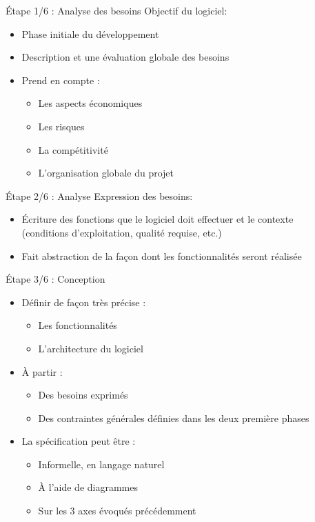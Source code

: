 \documentclass[14pt]{beamer}
\begin{document}
\begin{framentitle}{Étape 1/6 : Analyse des besoins}
    Objectif du logiciel:
    \begin{itemize}
        \item Phase initiale du développement
        \item Description et une évaluation globale des besoins
        \item Prend en compte :
            \begin{itemize}
                \item Les aspects économiques
                \item Les risques
                \item La compétitivité
                \item L'organisation globale du projet
            \end{itemize}
    \end{itemize}
\end{framentitle}

\begin{framentitle}{Étape 2/6 : Analyse}
    Expression des besoins:
    \begin{itemize}
        \item Écriture des fonctions que le logiciel doit effectuer et le
            contexte\\
            (conditions d'exploitation, qualité requise, etc.)
        \item Fait abstraction de la façon dont les fonctionnalités seront
            réalisée
    \end{itemize}
\end{framentitle}

\begin{framentitle}{Étape 3/6 : Conception}
    \begin{itemize}
        \item Définir de façon très précise :
            \begin{itemize}
                \item Les fonctionnalités
                \item L'architecture du logiciel
            \end{itemize}
        \item À partir :
            \begin{itemize}
                \item Des besoins exprimés
                \item Des contraintes générales définies dans les deux première
                    phases
            \end{itemize}
        \item La spécification peut être :
            \begin{itemize}
                \item Informelle, en langage naturel
                \item À l'aide de diagrammes
                \item Sur les 3 axes évoqués précédemment
            \end{itemize}
    \end{itemize}
\end{framentitle}
\end{document}

